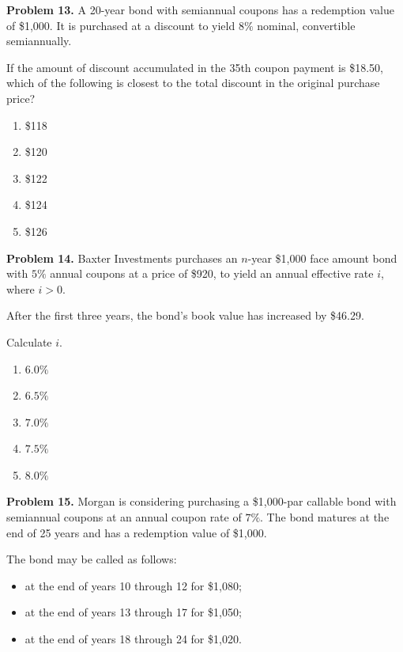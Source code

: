\documentclass[12pt]{article}
\begin{document}
\newpage

\noindent \textbf{Problem 13.}
A 20-year bond with semiannual coupons has a redemption value of \$1{,}000. It is purchased at a discount to yield $8\%$ nominal, convertible semiannually.

If the amount of discount accumulated in the 35th coupon payment is \$18.50, which of the following is closest to the total discount in the original purchase price?

\vspace{.5cm}

\begin{enumerate}[label = \Alph*.]
\item \$118
\item \$120
\item \$122
\item \$124
\item \$126
\end{enumerate}

\newpage

\noindent \textbf{Problem 14.}
Baxter Investments purchases an $n$-year \$1{,}000 face amount bond with $5\%$ annual coupons at a price of \$920, to yield an annual effective rate $i$, where $i>0$.

After the first three years, the bond's book value has increased by \$46.29.

Calculate $i$.

\vspace{.5cm}

\begin{enumerate}[label = \Alph*.]
\item $6.0\%$
\item $6.5\%$
\item $7.0\%$
\item $7.5\%$
\item $8.0\%$
\end{enumerate}

\newpage

\noindent \textbf{Problem 15.}
Morgan is considering purchasing a \$1{,}000-par callable bond with semiannual coupons at an annual coupon rate of $7\%$. The bond matures at the end of 25 years and has a redemption value of \$1{,}000.

The bond may be called as follows:

\begin{itemize}
    \item at the end of years 10 through 12 for \$1{,}080;
    \item at the end of years 13 through 17 for \$1{,}050;
    \item at the end of years 18 through 24 for \$1{,}020.
\end{itemize}
\end{document}

